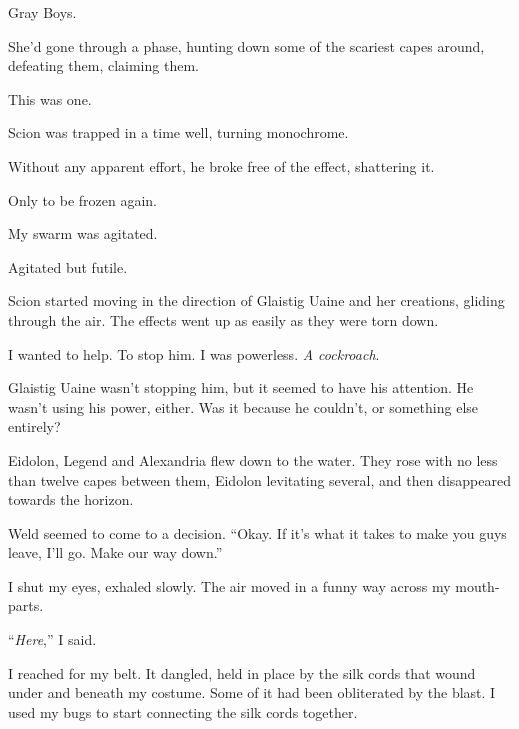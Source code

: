 Gray Boys.



She'd gone through a phase, hunting down some of the scariest capes around, defeating them, claiming them.



This was one.



Scion was trapped in a time well, turning monochrome.



Without any apparent effort, he broke free of the effect, shattering it.



Only to be frozen again.



My swarm was agitated.



Agitated but futile.



Scion started moving in the direction of Glaistig Uaine and her creations, gliding through the air.  The effects went up as easily as they were torn down.



I wanted to help.  To stop him.  I was powerless.  \emph{A cockroach}.



Glaistig Uaine wasn't stopping him, but it seemed to have his attention.  He wasn't using his power, either.  Was it because he couldn't, or something else entirely?



Eidolon, Legend and Alexandria flew down to the water.  They rose with no less than twelve capes between them, Eidolon levitating several, and then disappeared towards the horizon.



Weld seemed to come to a decision.  ``Okay.  If it's what it takes to make you guys leave, I'll go.  Make our way down.''



I shut my eyes, exhaled slowly.  The air moved in a funny way across my mouth-parts.



``\emph{Here},'' I said.



I reached for my belt.  It dangled, held in place by the silk cords that wound under and beneath my costume.  Some of it had been obliterated by the blast.  I used my bugs to start connecting the silk cords together.



